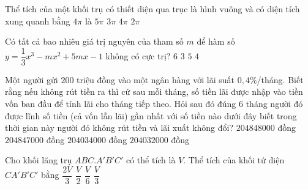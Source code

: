 \begin{ex}%
Thể tích của một khối trụ có thiết diện qua trục là hình vuông và có diện tích xung quanh bằng $4\pi$ là
\choice
{$5\pi$}
{$3\pi$}
{$4\pi$}
{\True $2\pi$}
\end{ex}

\begin{ex}%
Có tất cả bao nhiêu giá trị nguyên của tham số $m$ để hàm số $y=\dfrac{1}{3}x^3-mx^2+5mx-1$ không có cực trị?
\choice
{\True $6$}
{$3$}
{$5$}
{$4$}
\end{ex}

\begin{ex}%
Một người gửi $200$ triệu đồng vào một ngân hàng với lãi suất $0{,}4\%$/tháng. Biết rằng nếu không rút tiền ra thì cứ sau mỗi tháng, số tiền lãi được nhập vào tiền vốn ban đầu để tính lãi cho tháng tiếp theo. Hỏi sau đó đúng $6$ tháng người đó được lĩnh số tiền (cả vốn lẫn lãi) gần nhất với số tiền nào dưới đây biết trong thời gian này người đó không rút tiền và lãi xuất không đổi?
\choice
{\True $204848000$ đồng}
{$204847000$ đồng}
{$204034000$ đồng}
{$204032000$ đồng}
\end{ex}

\begin{ex}%
Cho khối lăng trụ $ABC.A'B'C'$ có thể tích là $V$. Thể tích của khối tứ diện $CA'B'C'$ bằng
\choice
{$\dfrac{2V}{3}$}
{$\dfrac{V}{2}$}
{$\dfrac{V}{6}$}
{\True $\dfrac{V}{3}$}
\end{ex}

